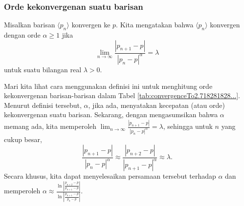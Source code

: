 \subsubsection{Orde kekonvergenan suatu barisan}

Misalkan barisan $\langle p_{n}\rangle$ konvergen ke $p$. Kita mengatakan
bahwa $\langle p_{n}\rangle$ konvergen dengan orde $\alpha\geq1$
jika
\[
\lim_{n\to\infty}\frac{\left|p_{n+1}-p\right|}{\left|p_{n}-p\right|^{\alpha}}=\lambda
\]
untuk suatu bilangan real $\lambda>0$. 

Mari kita lihat cara menggunakan definisi ini untuk menghitung orde
kekonvergenan barisan-barisan dalam Tabel \ref{tab:convergenceTo2.718281828...}.
Menurut definisi tersebut, $\alpha$, jika ada, menyatakan kecepatan
(atau orde) kekonvergenan  suatu barisan.
Sekarang, dengan mengasumsikan bahwa $\alpha$ memang ada, kita memperoleh
$\lim_{n\to\infty}\frac{\left|p_{n+1}-p\right|}{\left|p_{n}-p\right|^{\alpha}}=\lambda$,
sehingga untuk $n$ yang cukup besar,
\[
\frac{\left|p_{n+1}-p\right|}{\left|p_{n}-p\right|^{\alpha}}\approx\frac{\left|p_{n+2}-p\right|}{\left|p_{n+1}-p\right|^{\alpha}}\approx\lambda.
\]
Secara khusus, kita dapat menyelesaikan persamaan tersebut terhadap
$\alpha$ dan memperoleh ${\displaystyle \alpha\approx\frac{\ln\left|\frac{p_{n+2}-p}{p_{n+1}-p}\right|}{\ln\left|\frac{p_{n+1}-p}{p_{n}-p}\right|}}$.

